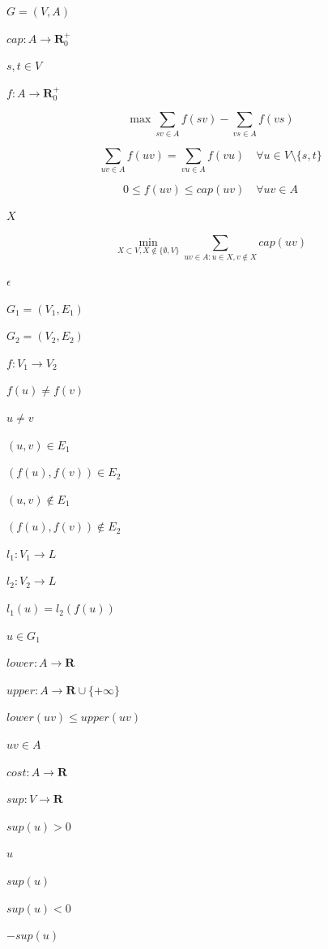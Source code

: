 \documentclass{article}
\begin{document}
$G=(V,A)$
\pagebreak

$cap: A\rightarrow\mathbf{R}^+_0$
\pagebreak

$s, t \in V$
\pagebreak

$f: A\rightarrow\mathbf{R}^+_0$
\pagebreak

\[ \max\sum_{sv\in A} f(sv) - \sum_{vs\in A} f(vs) \]
\pagebreak

\[ \sum_{uv\in A} f(uv) = \sum_{vu\in A} f(vu) \quad \forall u\in V\setminus\{s,t\} \]
\pagebreak

\[ 0 \leq f(uv) \leq cap(uv) \quad \forall uv\in A \]
\pagebreak

$X$
\pagebreak

\[ \min_{X \subset V, X\not\in \{\emptyset, V\}} \sum_{uv\in A: u\in X, v\not\in X}cap(uv) \]
\pagebreak

$\epsilon$
\pagebreak

$G_1=(V_1,E_1)$
\pagebreak

$G_2=(V_2,E_2)$
\pagebreak

$f:V_1\longrightarrow V_2$
\pagebreak

$f(u)\neq f(v)$
\pagebreak

$u\neq v$
\pagebreak

$(u,v)\in E_1$
\pagebreak

$(f(u),f(v))\in E_2$
\pagebreak

$(u,v)\not\in E_1$
\pagebreak

$(f(u),f(v))\not\in E_2$
\pagebreak

$l_1:V_1\longrightarrow L$
\pagebreak

$l_2:V_2\longrightarrow L$
\pagebreak

$l_1(u)=l_2(f(u))$
\pagebreak

$u \in G_1$
\pagebreak

$lower: A\rightarrow\mathbf{R}$
\pagebreak

$upper: A\rightarrow\mathbf{R}\cup\{+\infty\}$
\pagebreak

$lower(uv) \leq upper(uv)$
\pagebreak

$uv\in A$
\pagebreak

$cost: A\rightarrow\mathbf{R}$
\pagebreak

$sup: V\rightarrow\mathbf{R}$
\pagebreak

$sup(u)>0$
\pagebreak

$u$
\pagebreak

$sup(u)$
\pagebreak

$sup(u)<0$
\pagebreak

$-sup(u)$
\pagebreak
\end{document}
